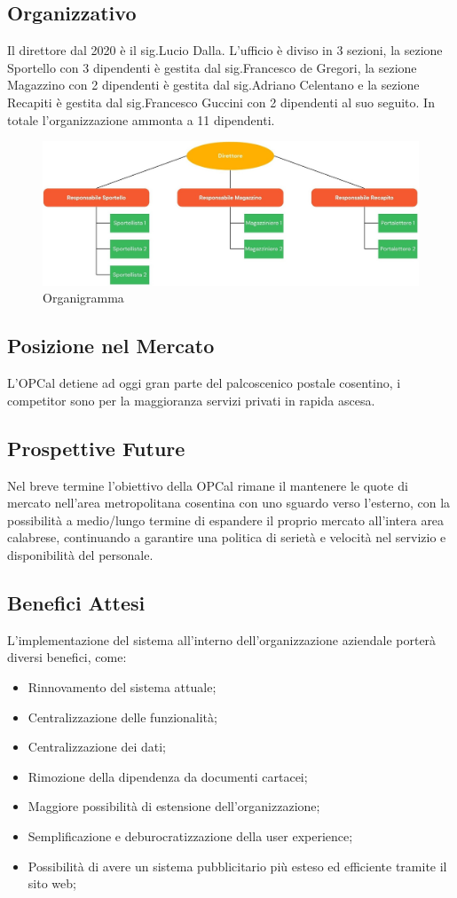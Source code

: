 \documentclass{article}
\begin{document}
\subsection{Organizzativo}
Il direttore dal 2020 è il sig.Lucio Dalla. L'ufficio è diviso in 3 sezioni, la sezione Sportello con 3 dipendenti è gestita dal sig.Francesco de Gregori, la sezione Magazzino con 2 dipendenti è gestita dal sig.Adriano Celentano e la sezione Recapiti è gestita dal sig.Francesco Guccini con 2 dipendenti al suo seguito. In totale l'organizzazione ammonta a 11 dipendenti.
\begin{figure}[h]
    \centering
    \includegraphics[width=0.8\linewidth]{assets/organigramma.jpg}
    \caption{Organigramma}
    \label{fig:enter_label}
\end{figure}
\subsection{Posizione nel Mercato}
L'OPCal detiene ad oggi gran parte del palcoscenico postale cosentino, i competitor sono per la maggioranza servizi privati in rapida ascesa.
\subsection{Prospettive Future}
Nel breve termine l'obiettivo della OPCal rimane il mantenere le quote di mercato nell'area metropolitana cosentina con uno sguardo verso l'esterno, con la possibilità a medio/lungo termine di espandere il proprio mercato all'intera area calabrese, continuando a garantire una politica di serietà e velocità nel servizio e disponibilità del personale. 
\subsection{Benefici Attesi}
L'implementazione del sistema all'interno dell'organizzazione aziendale porterà diversi benefici, come: 
\begin{itemize}
    \item Rinnovamento del sistema attuale;
    \item Centralizzazione delle funzionalità;
    \item Centralizzazione dei dati;
    \item Rimozione della dipendenza da documenti cartacei;
    \item Maggiore possibilità di estensione dell'organizzazione;
    \item Semplificazione e deburocratizzazione della user experience;
    \item Possibilità di avere un sistema pubblicitario più esteso ed efficiente tramite il sito web; 
    
\end{itemize}
\end{document}
